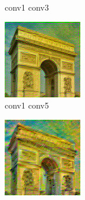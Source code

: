 \documentclass[twocolumn,superscriptaddress,aps, floatfix]{revtex4-1}
\begin{document}
\begin{figure}[ht]
\begin{subfigure}[b]{0.1\textwidth}
            \caption{conv1 conv3}
        \end{subfigure}
        \hfill
        \begin{subfigure}[b]{0.1\textwidth}
            \centering
            \includegraphics[width=\textwidth]{resources/png/layers/conv1_conv5.png}
            \caption{conv1 conv5}
        \end{subfigure}
        \hfill
        \begin{subfigure}[b]{0.1\textwidth}
            \centering
            \includegraphics[width=\textwidth]{resources/png/layers/conv1_conv9.png}

\end{subfigure}
\end{figure}
\end{document}
